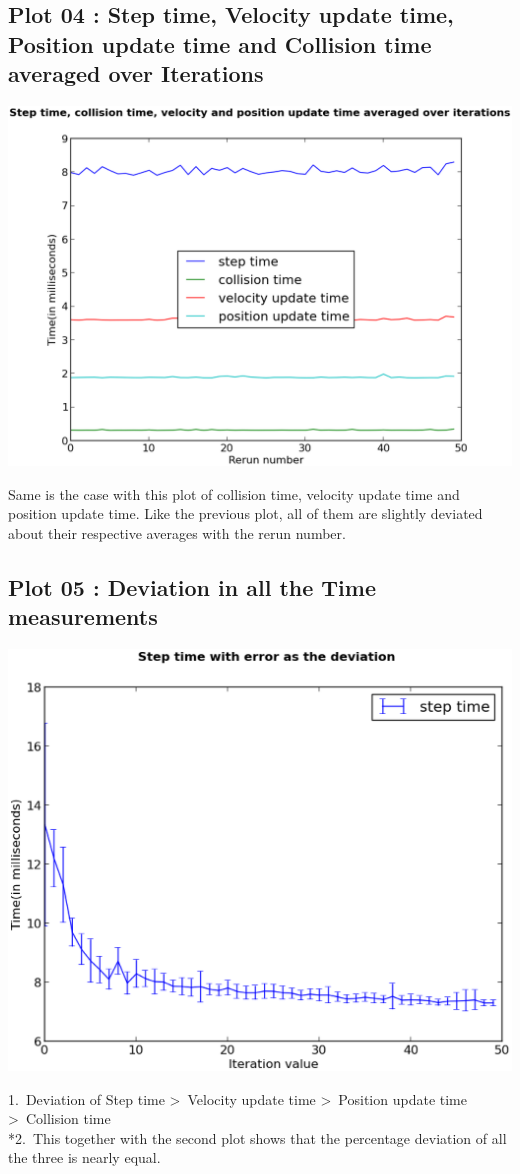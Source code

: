 \documentclass[11pt]{article}
\begin{document}
\subsection{Plot 04 : Step time, Velocity update time, Position update time and Collision time averaged over Iterations}
\begin{center}
\includegraphics[scale=0.5]{plot04}
\end{center}
Same is the case with this plot of collision time, velocity update time and position update time. Like the previous plot, all of them are slightly deviated about their respective averages with the rerun number.
\subsection{Plot 05 : Deviation in all the Time measurements}
\begin{center}
\includegraphics[scale=0.5]{plot05}
\end{center}
1.\ Deviation of Step time \textgreater \ Velocity update time \textgreater \ Position update time \textgreater \ Collision time
\\*2.\ This together with the second plot shows that the percentage deviation of all the three is nearly equal.
\end{document}
